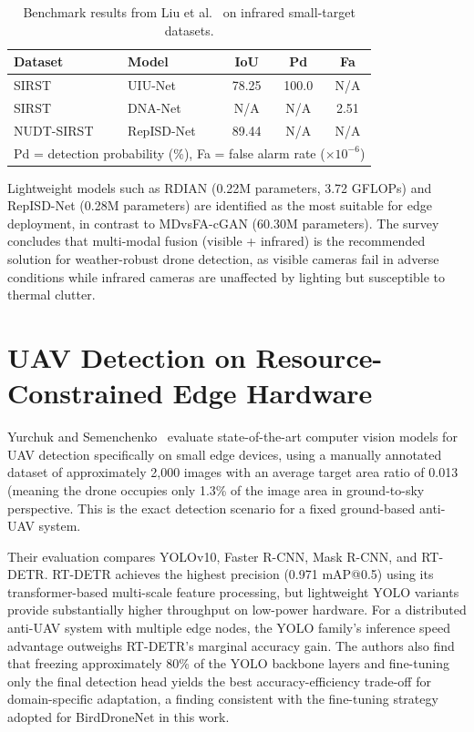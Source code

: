 \documentclass[12pt,a4paper]{report}
\renewcommand{\arraystretch}{1.1}
\begin{document}
\begin{table}[H]
\centering
\caption[Benchmark results on infrared small-target datasets]{Benchmark results from Liu et al.~\cite{liu2024survey} on infrared small-target datasets.}
\label{tab:survey_benchmarks}
\small
\renewcommand{\arraystretch}{0.9}
\begin{tabular}{|l|l|c|c|c|}
\hline
\rowcolor{gray!20}
\textbf{Dataset} & \textbf{Model} & \textbf{IoU} & \textbf{Pd} & \textbf{Fa} \\
\hline
SIRST  & UIU-Net      & 78.25 & 100.0 & N/A  \\
SIRST  & DNA-Net      & N/A   & N/A   & 2.51 \\
NUDT-SIRST & RepISD-Net & 89.44 & N/A  & N/A  \\
\hline
\multicolumn{5}{|l|}{\small Pd = detection probability (\%), Fa = false alarm rate ($\times 10^{-6}$)} \\
\hline
\end{tabular}
\end{table}

Lightweight models such as RDIAN (0.22M parameters, 3.72 GFLOPs) and
RepISD-Net (0.28M parameters) are identified as the most suitable for edge
deployment, in contrast to MDvsFA-cGAN (60.30M parameters). The survey
concludes that multi-modal fusion (visible + infrared) is the recommended
solution for weather-robust drone detection, as visible cameras fail in
adverse conditions while infrared cameras are unaffected by lighting
but susceptible to thermal clutter.

\section{UAV Detection on Resource-Constrained Edge Hardware}

Yurchuk and Semenchenko~\cite{yurchuk2024edge} evaluate state-of-the-art
computer vision models for UAV detection specifically on small edge devices,
using a manually annotated dataset of approximately 2,000 images with an
average target area ratio of 0.013 (meaning the drone occupies only
1.3\% of the image area in ground-to-sky perspective. This is the exact
detection scenario for a fixed ground-based anti-UAV system.

Their evaluation compares YOLOv10, Faster R-CNN, Mask R-CNN, and RT-DETR.
RT-DETR achieves the highest precision (0.971 mAP@0.5) using its
transformer-based multi-scale feature processing, but lightweight YOLO
variants provide substantially higher throughput on low-power hardware.
For a distributed anti-UAV system with multiple edge nodes, the YOLO
family's inference speed advantage outweighs RT-DETR's marginal accuracy
gain. The authors also find that freezing approximately 80\% of the YOLO
backbone layers and fine-tuning only the final detection head yields the
best accuracy-efficiency trade-off for domain-specific adaptation,
a finding consistent with the fine-tuning strategy adopted for
BirdDroneNet in this work.
\end{document}
